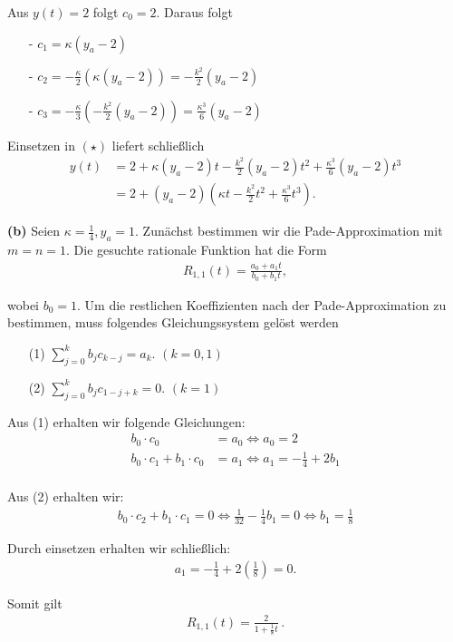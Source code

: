 \documentclass[10pt]{article}
\begin{document}
  Aus $y(t) = 2$ folgt $c_0 = 2$. Daraus folgt
  \begin{itemize}
    \item[-] $c_1 = \kappa(y_a - 2)$
    \item[-] $c_2 = -\frac{\kappa}{2} (\kappa (y_a - 2)) = -\frac{k^2}{2}(y_a - 2)$ 
    \item[-] $c_3 = -\frac{\kappa}{3}(-\frac{k^2}{2}(y_a - 2)) = \frac{\kappa^3}{6}(y_a - 2)$
  \end{itemize}

  Einsetzen in $(\star)$ liefert schließlich 
  \begin{align*}
    y(t) &= 2 + \kappa(y_a - 2)t - \frac{k^2}{2}(y_a - 2)t^2 + \frac{\kappa^3}{6}(y_a - 2)t^3 \\
         &= 2 + (y_a - 2) \left( \kappa t - \frac{k^2}{2} t^2 + \frac{\kappa^3}{6} t^3 \right).
  \end{align*}
  
  \newpage 

  \textbf{(b)} Seien $\kappa = \frac{1}{4}, y_a = 1$. Zunächst bestimmen wir die Pade-Approximation mit $m=n=1$. 
    Die gesuchte rationale Funktion hat die Form 
    \begin{align*}
      R_{1,1}(t) = \frac{a_0 + a_1t}{b_0 + b_1t},
    \end{align*}

    wobei $b_0 = 1$.
    Um die restlichen Koeffizienten nach der Pade-Approximation zu bestimmen, muss folgendes Gleichungssystem gelöst werden
    \begin{enumerate}
      \item[(1)] $\sum_{j=0}^{k} b_j c_{k-j} = a_k$. \quad $(k = 0,1)$
      \item[(2)] $\sum_{j=0}^{k} b_j c_{1-j+k} = 0$. \quad $(k = 1)$ 
    \end{enumerate}

    Aus (1) erhalten wir folgende Gleichungen: 
    \begin{align*}
      b_0\cdot c_0 &= a_0 \iff a_0 = 2    \\
      b_0\cdot c_1 + b_1\cdot c_0 &= a_1 \iff a_1 = -\frac{1}{4} + 2b_1   \\
    \end{align*}

    Aus (2) erhalten wir: 
    \begin{align*}
      b_0\cdot c_2 + b_1\cdot c_1 = 0 \iff \frac{1}{32} - \frac{1}{4}b_1 = 0 \iff b_1 = \frac{1}{8}
    \end{align*}

    Durch einsetzen erhalten wir schließlich:
    \begin{align*}
      a_1 = -\frac{1}{4} + 2\left(\frac{1}{8}\right) = 0.
    \end{align*}

    Somit gilt 
    \begin{align*}
      R_{1,1}(t) = \frac{2}{1+\frac{1}{8}t}\,.
    \end{align*}
\end{document}
